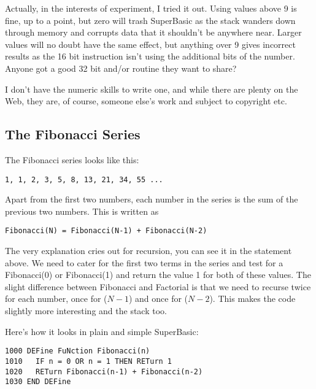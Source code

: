 Actually, in the interests of experiment, I tried it out. Using
      values above 9 is fine, up to a point, but zero will trash SuperBasic as
      the stack wanders down through memory and corrupts data that it shouldn't
      be anywhere near. Larger values will no doubt have the same effect, but
      anything over 9 gives incorrect results as the 16 bit  instruction
      isn't using the additional bits of the number. Anyone got a good 32 bit
       and/or  routine they want to share?

I don't have the numeric skills to write one, and while there are
      plenty on the Web, they are, of course, someone else's work and subject
      to copyright etc.

\subsection{The Fibonacci Series}
\label{ch13-fibonacci}%

The Fibonacci series looks like this:

\begin{lstlisting}[firstnumber=1,frame=none,numbers=none]
1, 1, 2, 3, 5, 8, 13, 21, 34, 55 ...
\end{lstlisting}

Apart from the first two numbers, each number in the series is the
      sum of the previous two numbers. This is written as

\begin{lstlisting}[firstnumber=1,frame=none,numbers=none]
Fibonacci(N) = Fibonacci(N-1) + Fibonacci(N-2)
\end{lstlisting}

The very explanation cries out for recursion, you can see it in
      the statement above. We need to cater for the first two terms in the
      series and test for a Fibonacci(0) or Fibonacci(1) and return the value
      1 for both of these values. The slight difference between Fibonacci and
      Factorial is that we need to recurse twice for each number, once for
      ($N-{}1$) and once for ($N-{}2$). This makes the code slightly more interesting
      and the stack too.

Here's how it looks in plain and simple SuperBasic:

\begin{lstlisting}[firstnumber=1,language={}]
1000 DEFine FuNction Fibonacci(n)
1010   IF n = 0 OR n = 1 THEN RETurn 1
1020   RETurn Fibonacci(n-1) + Fibonacci(n-2)
1030 END DEFine
\end{lstlisting}


